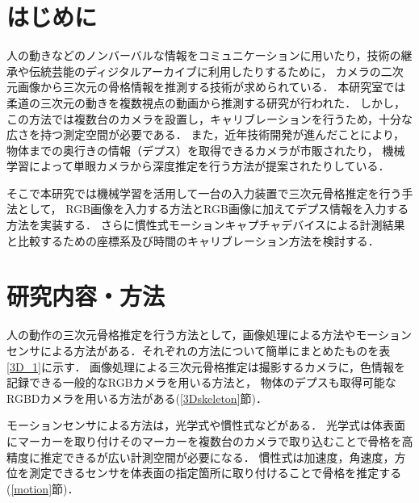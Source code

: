 \documentclass[a4j, fleqn, 12pt]{jsreport}
\begin{document}
\maketitle
\tableofcontents
\cleardoublepage
{}

\chapter{はじめに}
人の動きなどのノンバーバルな情報をコミュニケーションに用いたり，技術の継承や伝統芸能のディジタルアーカイブに利用したりするために，
カメラの二次元画像から三次元の骨格情報を推測する技術が求められている．
本研究室では柔道の三次元の動きを複数視点の動画から推測する研究\cite{turugi}が行われた．
しかし，この方法では複数台のカメラを設置し，キャリブレーションを行うため，十分な広さを持つ測定空間が必要である．
また，近年技術開発が進んだことにより，物体までの奥行きの情報（デプス）を取得できるカメラが市販されたり，
機械学習によって単眼カメラから深度推定を行う方法\cite{depth}が提案されたりしている．

そこで本研究では機械学習を活用して一台の入力装置で三次元骨格推定を行う手法として，
RGB画像を入力する方法とRGB画像に加えてデプス情報を入力する方法を実装する．
さらに慣性式モーションキャプチャデバイスによる計測結果と比較するための座標系及び時間のキャリブレーション方法を検討する．

\chapter{研究内容・方法}
人の動作の三次元骨格推定を行う方法として，画像処理による方法やモーションセンサによる方法がある．それぞれの方法について簡単にまとめたものを表\ref{3D_1}に示す．
画像処理による三次元骨格推定は撮影するカメラに，色情報を記録できる一般的なRGBカメラを用いる方法と，
物体のデプスも取得可能なRGBDカメラを用いる方法がある(\ref{3Dskeleton}節)．

モーションセンサによる方法は，光学式や慣性式などがある．
光学式は体表面にマーカーを取り付けそのマーカーを複数台のカメラで取り込むことで骨格を高精度に推定できるが広い計測空間が必要になる．
慣性式は加速度，角速度，方位を測定できるセンサを体表面の指定箇所に取り付けることで骨格を推定する(\ref{motion}節)．

\end{document}
